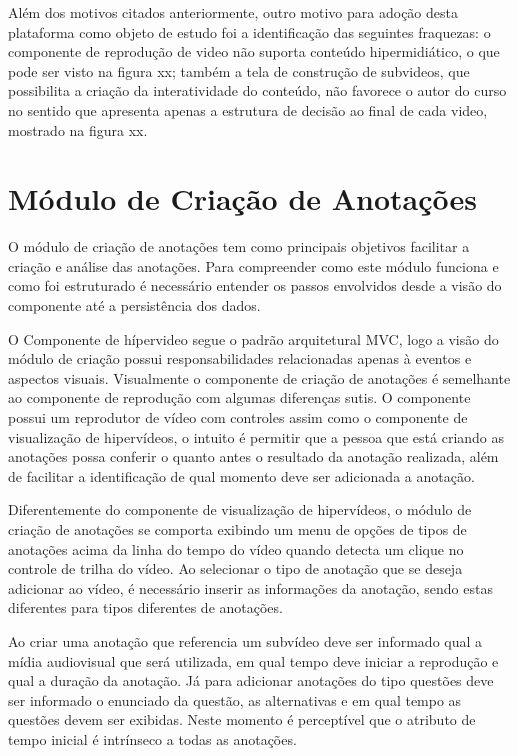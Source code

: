 Além dos motivos citados anteriormente, outro motivo para adoção desta plataforma como objeto de estudo foi a identificação das seguintes fraquezas: o componente de reprodução de video não suporta conteúdo hipermidiático, o que pode ser visto na figura xx; também a tela de construção de subvideos, que possibilita a criação da interatividade do conteúdo, não favorece o autor do curso no sentido que apresenta apenas a estrutura de decisão ao final de cada video, mostrado na figura xx.


\section{Módulo de Criação de Anotações}

O módulo de criação de anotações tem como principais objetivos facilitar a criação e análise das anotações. Para compreender como este módulo funciona e como foi estruturado é necessário entender os passos envolvidos desde a visão do componente até a persistência dos dados.

O Componente de hípervideo segue o padrão arquitetural MVC, logo a visão do módulo de criação possui responsabilidades relacionadas apenas à eventos e aspectos visuais. Visualmente o componente de criação de anotações é semelhante ao componente de reprodução com algumas diferenças sutis. O componente possui um reprodutor de vídeo com controles assim como o componente de visualização de hipervídeos, o intuito é permitir que a pessoa que está criando as anotações possa conferir o quanto antes o resultado da anotação realizada, além de facilitar a identificação de qual momento deve ser adicionada a anotação.

Diferentemente do componente de visualização de hipervídeos, o módulo de criação de anotações se comporta exibindo um menu de opções de tipos de anotações acima da linha do tempo do vídeo quando detecta um clique no controle de trilha do vídeo. Ao selecionar o tipo de anotação que se deseja adicionar ao vídeo, é necessário inserir as informações da anotação, sendo estas diferentes para tipos diferentes de anotações.

Ao criar uma anotação que referencia um subvídeo deve ser informado qual a mídia audiovisual que será utilizada, em qual tempo deve iniciar a reprodução e qual a duração da anotação. Já para adicionar anotações do tipo questões deve ser informado o enunciado da questão, as alternativas e em qual tempo as questões devem ser exibidas. Neste momento é perceptível que o atributo de tempo inicial é intrínseco a todas as anotações.

